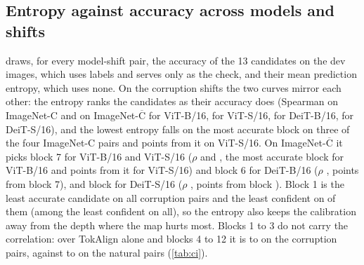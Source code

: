 \documentclass{article}
\newcommand{\tok}{TokAlign}
\begin{document}
\subsection{Entropy against accuracy across models and shifts}
\label{app:signal}
 draws, for every model-shift pair, the accuracy of the 13 candidates on the dev images, which uses labels and serves only as the check, and their mean prediction entropy, which uses none. On the corruption shifts the two curves mirror each other: the entropy ranks the candidates as their accuracy does (Spearman  on ImageNet-C and  on ImageNet-$\overline{\text{C}}$ for ViT-B/16,  for ViT-S/16,  for DeiT-B/16,  for DeiT-S/16), and the lowest entropy falls on the most accurate block on three of the four ImageNet-C pairs and  points from it on ViT-S/16. On ImageNet-$\overline{\text{C}}$ it picks block 7 for ViT-B/16 and ViT-S/16 ($\rho$  and , the most accurate block for ViT-B/16 and  points from it for ViT-S/16) and block 6 for DeiT-B/16 ($\rho$ ,  points from block 7), and block  for DeiT-S/16 ($\rho$ ,  points from block ). Block 1 is the least accurate candidate on all  corruption pairs and the least confident on  of them (among the  least confident on all), so the entropy also keeps the calibration away from the depth where the map hurts most. Blocks 1 to 3 do not carry the correlation: over \tok{} alone and blocks 4 to 12 it is  to  on the  corruption pairs, against  to  on the  natural pairs (\cref{tab:ci}).
\end{document}

